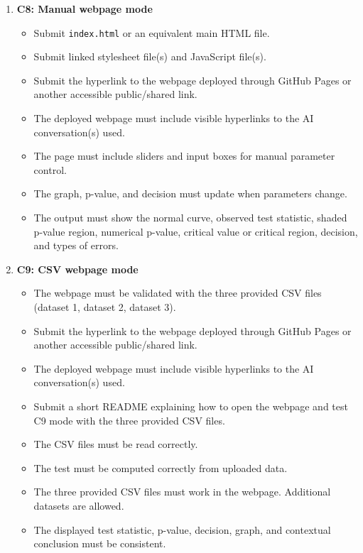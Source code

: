 \documentclass[12pt]{article}
\begin{document}
	\begin{enumerate}
		\item \textbf{C8: Manual webpage mode}
		\begin{itemize}
			\item Submit \texttt{index.html} or an equivalent main HTML file.
			\item Submit linked stylesheet file(s) and JavaScript file(s).
			\item Submit the hyperlink to the webpage deployed through GitHub Pages or another accessible public/shared link.
			\item The deployed webpage must include visible hyperlinks to the AI conversation(s) used.
			\item The page must include sliders and input boxes for manual parameter control.
			\item The graph, p-value, and decision must update when parameters change.
			\item The output must show the normal curve, observed test statistic, shaded p-value region, numerical p-value, critical value or critical region, decision, and types of errors.
		\end{itemize}
		
		\item \textbf{C9: CSV webpage mode}
		\begin{itemize}
			\item The webpage must be validated with the three provided CSV files (dataset 1, dataset 2, dataset 3).
			\item Submit the hyperlink to the webpage deployed through GitHub Pages or another accessible public/shared link.
			\item The deployed webpage must include visible hyperlinks to the AI conversation(s) used.
			\item Submit a short README explaining how to open the webpage and test C9 mode with the three provided CSV files.
			\item The CSV files must be read correctly.
			\item The test must be computed correctly from uploaded data.
			\item The three provided CSV files must work in the webpage. Additional datasets are allowed.
			\item The displayed test statistic, p-value, decision, graph, and contextual conclusion must be consistent.
		\end{itemize}
		

\end{enumerate}
\end{document}
